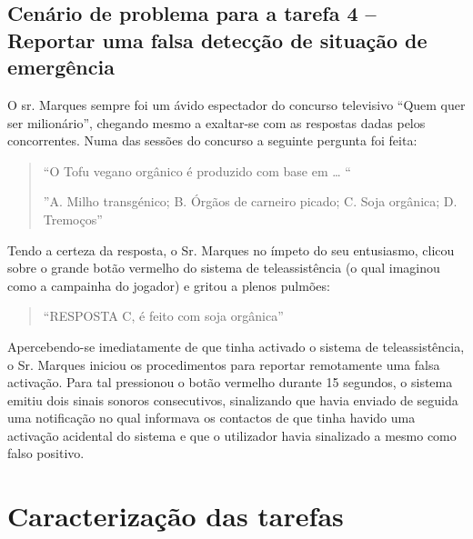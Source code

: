 \subsection{Cenário de problema para a tarefa 4 – Reportar uma falsa detecção de situação de emergência}

O sr. Marques sempre foi um ávido espectador do concurso televisivo “Quem quer ser milionário”, chegando mesmo a exaltar-se com as respostas dadas pelos concorrentes. Numa das sessões do concurso a seguinte pergunta foi feita:

\begin{quote}
	“O Tofu vegano orgânico é produzido com base em … “
	
	”A. Milho transgénico;	B. Órgãos de carneiro picado; C. Soja orgânica; D. Tremoços”
\end{quote}

Tendo a certeza da resposta, o Sr. Marques no ímpeto do seu entusiasmo, clicou sobre o grande botão vermelho do sistema de teleassistência (o qual imaginou como a campainha do jogador) e gritou a plenos pulmões:
\begin{quote}
	“RESPOSTA C, é feito com soja orgânica”
\end{quote}

Apercebendo-se imediatamente de que tinha activado o sistema de teleassistência, o Sr. Marques iniciou os procedimentos para reportar remotamente uma falsa activação. Para tal pressionou o botão vermelho durante 15 segundos, o sistema emitiu dois sinais sonoros consecutivos, sinalizando que havia enviado de seguida uma notificação no qual informava os contactos de que tinha havido uma activação acidental do sistema e que o utilizador havia sinalizado a mesmo como falso positivo. 

\section{Caracterização das tarefas}

